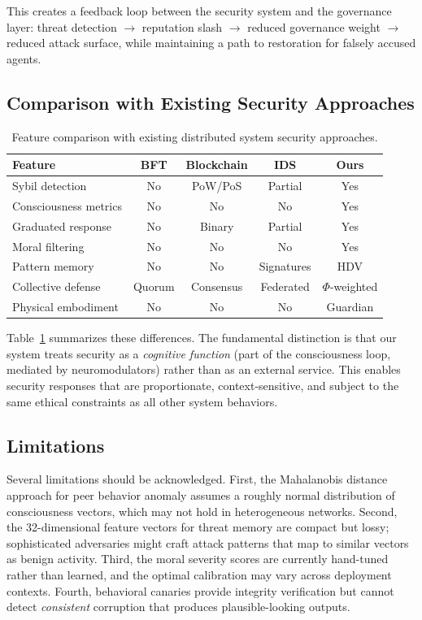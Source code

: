 \documentclass[11pt,a4paper]{article}
\begin{document}
This creates a feedback loop between the security system and the governance layer: threat detection $\to$ reputation slash $\to$ reduced governance weight $\to$ reduced attack surface, while maintaining a path to restoration for falsely accused agents.

\subsection{Comparison with Existing Security Approaches}

\begin{table}[h]
\centering
\caption{Feature comparison with existing distributed system security approaches.}
\label{tab:security_comparison}
\begin{tabular}{p{3.5cm}cccc}
\toprule
\textbf{Feature} & \textbf{BFT} & \textbf{Blockchain} & \textbf{IDS} & \textbf{Ours} \\
\midrule
Sybil detection & No & PoW/PoS & Partial & Yes \\
Consciousness metrics & No & No & No & Yes \\
Graduated response & No & Binary & Partial & Yes \\
Moral filtering & No & No & No & Yes \\
Pattern memory & No & No & Signatures & HDV \\
Collective defense & Quorum & Consensus & Federated & $\Phi$-weighted \\
Physical embodiment & No & No & No & Guardian \\
\bottomrule
\end{tabular}
\end{table}

Table~\ref{tab:security_comparison} summarizes these differences. The fundamental distinction is that our system treats security as a \emph{cognitive function} (part of the consciousness loop, mediated by neuromodulators) rather than as an external service. This enables security responses that are proportionate, context-sensitive, and subject to the same ethical constraints as all other system behaviors.

\subsection{Limitations}

Several limitations should be acknowledged. First, the Mahalanobis distance approach for peer behavior anomaly assumes a roughly normal distribution of consciousness vectors, which may not hold in heterogeneous networks. Second, the 32-dimensional feature vectors for threat memory are compact but lossy; sophisticated adversaries might craft attack patterns that map to similar vectors as benign activity. Third, the moral severity scores are currently hand-tuned rather than learned, and the optimal calibration may vary across deployment contexts. Fourth, behavioral canaries provide integrity verification but cannot detect \emph{consistent} corruption that produces plausible-looking outputs.
\end{document}
